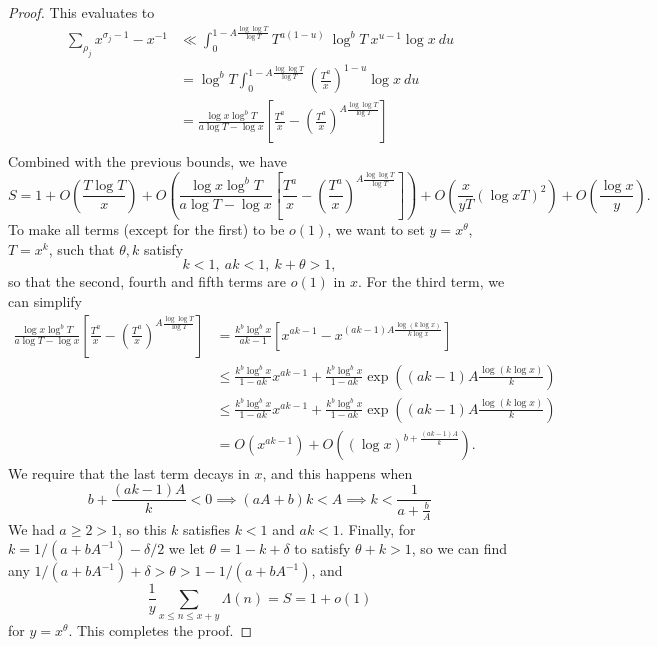 \begin{proof}
    This evaluates to 
    \begin{align*}
        \sum_{\rho_j} x^{\sigma_j-1} - x^{-1} & \ll \int_0^{1-A\frac{\log \log T}{\log T}} T^{a(1-u)} \ \log^b T \  x^{u-1} \log x \ du\\
        &= \log^b T \int_0^{1-A\frac{\log \log T}{\log T}} \left(\frac{T^{a}}{x}\right)^{1-u} \log x \ du\\
        &= \frac{\log x \log^{b} T}{a \log T - \log x } \left[\frac{T^a}{x}-\left(\frac{T^a}{x}\right)^{A\frac{\log \log T}{\log T}}\right]\\
    \end{align*}
    Combined with the previous bounds, we have \[
        S=1 + O\left(\frac{T\log T}{x}\right)+ O\left( \frac{\log x \log^{b} T}{a \log T - \log x } \left[\frac{T^a}{x}-\left(\frac{T^a}{x}\right)^{A\frac{\log \log T}{\log T}}\right]\right)+ O(\frac{x}{yT}(\log xT) ^2) + O(\frac{\log x}{y}) . 
    \]
    To make all terms (except for the first) to be $o(1)$, we want to set 
    $y=x^\theta$, $T=x^k$, such that $\theta,k$ satisfy \[
        k<1,\ ak<1, \ k+\theta>1, 
    \]
    so that the second, fourth and fifth terms are $o(1)$ in $x$.
    For the third term, we can simplify \begin{align*}
        \frac{\log x \log^{b} T}{a \log T - \log x } \left[\frac{T^a}{x}-\left(\frac{T^a}{x}\right)^{A\frac{\log \log T}{\log T}}\right]
        &= \frac{k^b \log^{b}x}{ak-1}  \left[x^{ak-1}-x^{(ak-1)A\frac{\log (k \log x)}{k \log x}}\right]
        \\ &\leq \frac{k^b \log^{b}x}{1-ak} x^{ak-1}  + \frac{k^b \log^{b}x}{1-ak} \exp\left((ak-1)A\frac{\log (k \log x)}{k} \right)\\
        &\leq \frac{k^b \log^{b}x}{1-ak} x^{ak-1}  + \frac{k^b \log^{b}x}{1-ak} \exp\left((ak-1)A\frac{\log (k \log x)}{k} \right)\\
        & =O(x^{ak-1})+O\left(\left(\log  x\right)^{b+\frac{(ak-1)A}{k}}\right).
    \end{align*}
    We require that the last term decays in $x$, and this happens when \[
        b+\frac{(ak-1)A}{k}< 0 \implies (aA+b)k<A \implies k < \frac{1}{a+\frac{b}{A}}
    \]
    We had $a\geq 2 >1$, so this $k$ satisfies $k<1$ and $ak<1$.
    Finally, for $k={1}/({a+bA^{-1}})- \delta/2$ we let $\theta = 1-k+\delta$ to satisfy $\theta+k>1$,
    so we can find any ${1}/({a+bA^{-1}})+\delta >\theta>1-{1}/({a+bA^{-1}})$, and \[
        \frac{1}{y}\sum_{x\leq n \leq x+y} \Lambda(n) = S = 1+o(1)
    \]for $y=x^\theta$. This completes the proof.

\end{proof}
